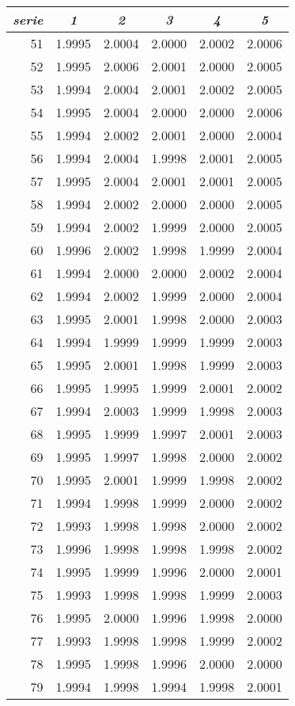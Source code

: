 \begin{tabular}{r*5c}
\emph{serie} &\emph{1} &\emph{2} &\emph{3} &\emph{4} &\emph{5}\\\hline
51 &1.9995 &2.0004 &2.0000 &2.0002 &2.0006\\
52 &1.9995 &2.0006 &2.0001 &2.0000 &2.0005\\
53 &1.9994 &2.0004 &2.0001 &2.0002 &2.0005\\
54 &1.9995 &2.0004 &2.0000 &2.0000 &2.0006\\
55 &1.9994 &2.0002 &2.0001 &2.0000 &2.0004\\
56 &1.9994 &2.0004 &1.9998 &2.0001 &2.0005\\
57 &1.9995 &2.0004 &2.0001 &2.0001 &2.0005\\
58 &1.9994 &2.0002 &2.0000 &2.0000 &2.0005\\
59 &1.9994 &2.0002 &1.9999 &2.0000 &2.0005\\
60 &1.9996 &2.0002 &1.9998 &1.9999 &2.0004\\
61 &1.9994 &2.0000 &2.0000 &2.0002 &2.0004\\
62 &1.9994 &2.0002 &1.9999 &2.0000 &2.0004\\
63 &1.9995 &2.0001 &1.9998 &2.0000 &2.0003\\
64 &1.9994 &1.9999 &1.9999 &1.9999 &2.0003\\
65 &1.9995 &2.0001 &1.9998 &1.9999 &2.0003\\
66 &1.9995 &1.9995 &1.9999 &2.0001 &2.0002\\
67 &1.9994 &2.0003 &1.9999 &1.9998 &2.0003\\
68 &1.9995 &1.9999 &1.9997 &2.0001 &2.0003\\
69 &1.9995 &1.9997 &1.9998 &2.0000 &2.0002\\
70 &1.9995 &2.0001 &1.9999 &1.9998 &2.0002\\
71 &1.9994 &1.9998 &1.9999 &2.0000 &2.0002\\
72 &1.9993 &1.9998 &1.9998 &2.0000 &2.0002\\
73 &1.9996 &1.9998 &1.9998 &1.9998 &2.0002\\
74 &1.9995 &1.9999 &1.9996 &2.0000 &2.0001\\
75 &1.9993 &1.9998 &1.9998 &1.9999 &2.0003\\
76 &1.9995 &2.0000 &1.9996 &1.9998 &2.0000\\
77 &1.9993 &1.9998 &1.9998 &1.9999 &2.0002\\
78 &1.9995 &1.9998 &1.9996 &2.0000 &2.0000\\
79 &1.9994 &1.9998 &1.9994 &1.9998 &2.0001\\

\end{tabular}
